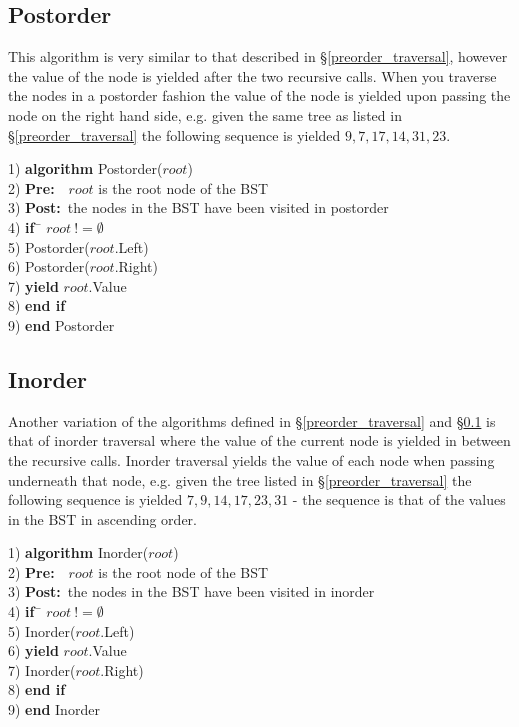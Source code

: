 \subsection{Postorder} \label{postorder_traversal}
This algorithm is very similar to that described in \S\ref{preorder_traversal}, however the value of the node is yielded after the two recursive calls. When you traverse the nodes in a postorder fashion the value of the node is yielded upon passing the node on the right hand side, e.g. given the same tree as listed in \S\ref{preorder_traversal} the following sequence is yielded $9, 7, 17, 14, 31, 23$.

\begin{tabbing}
1)  \textbf{alg}\= \textbf{orithm} Postorder($root$) \\
2)  \> \textbf{Pre:}~~$root$ is the root node of the BST \\
3)  \> \textbf{Post:}~the nodes in the BST have been visited in postorder \\
4)  \> \textbf{if}~\= $root~!= \emptyset$ \\
5)  \> \> Postorder($root$.Left) \\
6)  \> \> Postorder($root$.Right) \\
7)  \> \> \textbf{yield} $root$.Value \\
8)  \> \textbf{end if} \\
9)  \textbf{end} Postorder \\
\end{tabbing}

\subsection{Inorder}
Another variation of the algorithms defined in \S\ref{preorder_traversal} and \S\ref{postorder_traversal} is that of inorder traversal where the value of the current node is yielded in between the recursive calls. Inorder traversal yields the value of each node when passing underneath that node, e.g. given the tree listed in \S\ref{preorder_traversal} the following sequence is yielded $7, 9, 14, 17, 23, 31$ - the sequence is that of the values in the BST in ascending order.

\begin{tabbing}
1)  \textbf{alg}\= \textbf{orithm} Inorder($root$) \\
2)  \> \textbf{Pre:}~~$root$ is the root node of the BST \\
3)  \> \textbf{Post:}~the nodes in the BST have been visited in inorder \\
4)  \> \textbf{if}~\= $root~!= \emptyset$ \\
5)  \> \> Inorder($root$.Left) \\
6)  \> \> \textbf{yield} $root$.Value \\
7)  \> \> Inorder($root$.Right) \\
8)  \> \textbf{end if} \\
9)  \textbf{end} Inorder \\
\end{tabbing}

